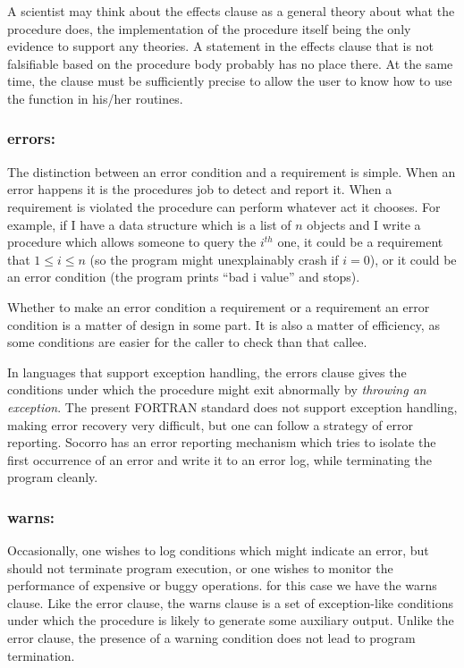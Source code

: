 A scientist may think about the effects clause as a general theory
about what the procedure does, the implementation of the procedure
itself being the only evidence to support any theories.  A statement
in the effects clause that is not falsifiable based on the procedure
body probably has no place there.  At the same time, the clause must
be sufficiently precise to allow the user to know how to use the
function in his/her routines.

\subsubsection{errors:}

The distinction between an error condition and a requirement is
simple.  When an error happens it is the procedures job to detect and
report it.  When a requirement is violated the procedure can perform
whatever act it chooses.  For example, if I have a data structure which
is a list of $n$ objects and I write a procedure which allows someone
to query the $i^{th}$ one, it could be a requirement that $1\le i\le n$
(so the program might unexplainably crash if $i=0$), or it could be
an error condition (the program prints ``bad i value'' and stops).

Whether to make an error condition a requirement or a requirement an
error condition is a matter of design in some part.  It is also a
matter of efficiency, as some conditions are easier for the caller to
check than that callee.

In languages that support exception handling, the errors clause gives
the conditions under which the procedure might exit abnormally by {\em
throwing an exception}.  The present FORTRAN standard does not support
exception handling, making error recovery very difficult, but one can
follow a strategy of error reporting.  Socorro has an error reporting
mechanism which tries to isolate the first occurrence of an error and
write it to an error log, while terminating the program cleanly.

\subsubsection{warns: }

Occasionally, one wishes to log conditions which might indicate an
error, but should not terminate program execution, or one wishes to
monitor the performance of expensive or buggy operations.  for this
case we have the warns clause.  Like the error clause, the warns
clause is a set of exception-like conditions under which the procedure
is likely to generate some auxiliary output.  Unlike the error
clause, the presence of a warning condition does not lead to program
termination.

